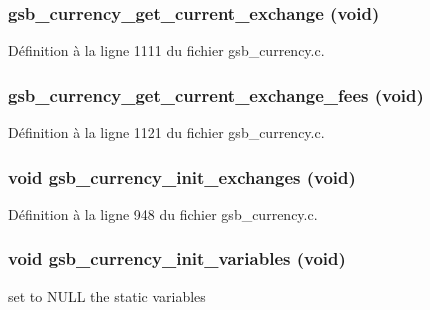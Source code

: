 \subsubsection[{gsb\_\-currency\_\-get\_\-current\_\-exchange}]{ gsb\_\-currency\_\-get\_\-current\_\-exchange (void)}\label{gsb__currency_8c_a1c636201d2a34c0b844ec47062791c5c}


Définition à la ligne 1111 du fichier gsb\_\-currency.c.

\subsubsection[{gsb\_\-currency\_\-get\_\-current\_\-exchange\_\-fees}]{ gsb\_\-currency\_\-get\_\-current\_\-exchange\_\-fees (void)}\label{gsb__currency_8c_a1ec60f51d17f25c548d65ec10fa7498a}


Définition à la ligne 1121 du fichier gsb\_\-currency.c.

\subsubsection[{gsb\_\-currency\_\-init\_\-exchanges}]{\setlength{\rightskip}{0pt plus 5cm}void gsb\_\-currency\_\-init\_\-exchanges (void)}\label{gsb__currency_8c_a11418c2c043ae6df7915c8f71a5af31e}


Définition à la ligne 948 du fichier gsb\_\-currency.c.

\subsubsection[{gsb\_\-currency\_\-init\_\-variables}]{\setlength{\rightskip}{0pt plus 5cm}void gsb\_\-currency\_\-init\_\-variables (void)}\label{gsb__currency_8c_ad3d2955dc098538b6745184d1dd571f0}
set to NULL the static variables


